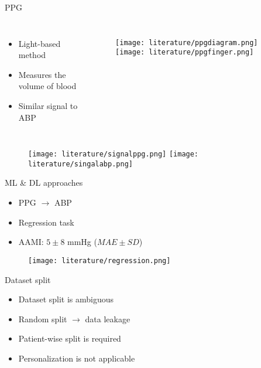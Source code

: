 \begin{frame}{PPG}
    \begin{columns}
        \begin{itemize}
            \item Light-based method
            \item Measures the volume of blood
            \item Similar signal to ABP
        \end{itemize}

        \begin{figure}
            \texttt{[image: literature/ppgdiagram.png]}
            \texttt{[image: literature/ppgfinger.png]}
        \end{figure}
    \end{columns}
    \begin{figure}
        \texttt{[image: literature/signalppg.png]}
        \texttt{[image: literature/singalabp.png]}
    \end{figure}

\end{frame}

\begin{frame}{ML \& DL approaches}
    \begin{itemize}
        \item PPG $\to$ ABP
        \item Regression task
        \item AAMI: $5\pm8$ mmHg ($MAE \pm SD$)
    \end{itemize}
    \begin{figure}
        \texttt{[image: literature/regression.png]}
    \end{figure}
\end{frame}

\begin{frame}{Dataset split}
    \begin{itemize}
        \item Dataset split is ambiguous
        \item Random split $\to$ data leakage
        \item Patient-wise split is required
        \item Personalization is not applicable
    \end{itemize}
    \begin{figure}
        
    \end{figure}
\end{frame}

